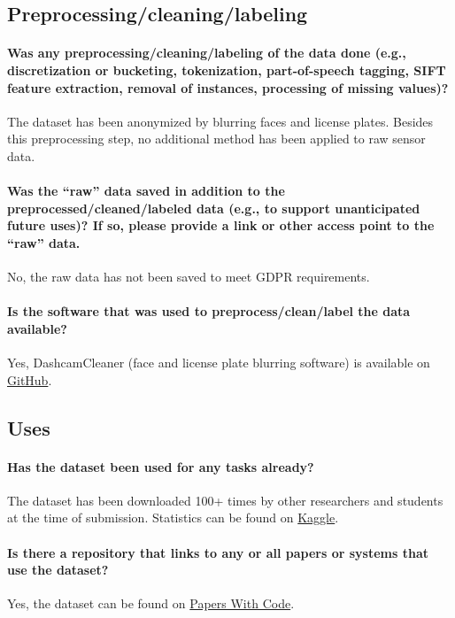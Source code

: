 \documentclass{article}
\begin{document}
\subsection{Preprocessing/cleaning/labeling}
\paragraph{Was any preprocessing/cleaning/labeling of the data done (e.g., discretization or bucketing, tokenization, part-of-speech tagging, SIFT feature extraction, removal of instances, processing of missing values)?} The dataset has been anonymized by blurring faces and license plates. Besides this preprocessing step, no additional method has been applied to raw sensor data.

\paragraph{Was the “raw” data saved in addition to the preprocessed/cleaned/labeled data (e.g., to support unanticipated future uses)? If so, please provide a link or other access point to the “raw” data.} No, the raw data has not been saved to meet GDPR requirements.

\paragraph{Is the software that was used to preprocess/clean/label the data available?} Yes, DashcamCleaner (face and license plate blurring software) is available on \href{https://github.com/tfaehse/DashcamCleaner}{GitHub}.


\subsection{Uses}
\paragraph{Has the dataset been used for any tasks already?} The dataset has been downloaded 100+ times by other researchers and students at the time of submission. Statistics can be found on \href{https://www.kaggle.com/datasets/tamasmatuszka/aimotive-multimodal-dataset}{Kaggle}. 

\paragraph{Is there a repository that links to any or all papers or systems that use the dataset?} Yes, the dataset can be found on \href{https://paperswithcode.com/dataset/aimotive-dataset}{Papers With Code}.
\end{document}
